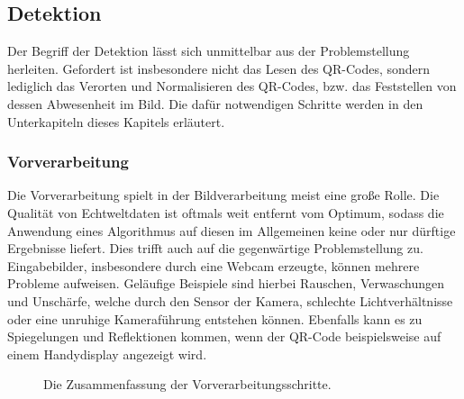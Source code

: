\documentclass[a4paper, oneside, 12pt]{article}
\begin{document}
\subsection{Detektion}
\label{s:detektion}

Der Begriff der Detektion lässt sich unmittelbar aus der Problemstellung herleiten.
Gefordert ist insbesondere nicht das Lesen des QR-Codes, sondern lediglich das Verorten und Normalisieren des QR-Codes, bzw. das Feststellen von dessen Abwesenheit im Bild. Die dafür notwendigen Schritte werden in den Unterkapiteln dieses Kapitels erläutert.

\subsubsection{Vorverarbeitung}
Die Vorverarbeitung spielt in der Bildverarbeitung meist eine große Rolle. Die Qualität von Echtweltdaten ist oftmals weit entfernt vom Optimum, sodass die Anwendung eines Algorithmus auf diesen im Allgemeinen keine oder nur dürftige Ergebnisse liefert.
Dies trifft auch auf die gegenwärtige Problemstellung zu. Eingabebilder, insbesondere durch eine Webcam erzeugte, können mehrere Probleme aufweisen.
Geläufige Beispiele sind hierbei Rauschen, Verwaschungen und Unschärfe, welche durch den Sensor der Kamera, schlechte Lichtverhältnisse oder eine unruhige Kameraführung entstehen können. Ebenfalls kann es zu Spiegelungen und Reflektionen kommen, wenn  der QR-Code beispielsweise auf einem Handydisplay angezeigt wird.

\begin{figure}[h]
	\begin{center}
	\end{center}
	\caption{Die Zusammenfassung der Vorverarbeitungsschritte.}
	\label{fig:vorverarbeitung}
\end{figure}
\end{document}
